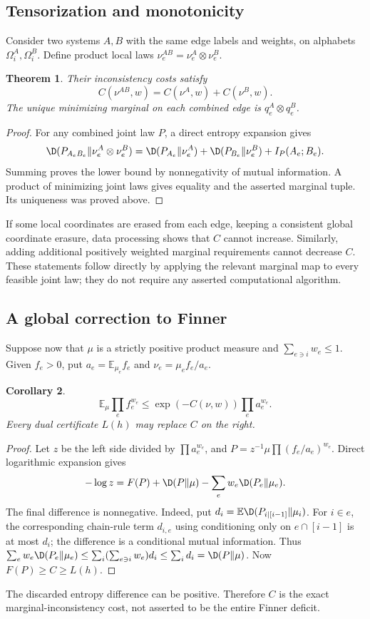 \documentclass[11pt,a4paper]{article}
\newtheorem{theorem}{Theorem}[section]
\newtheorem{corollary}[theorem]{Corollary}
\theoremstyle{definition}\newtheorem{definition}[theorem]{Definition}
\theoremstyle{remark}\newtheorem{remark}[theorem]{Remark}
\newcommand{\E}{\mathbb E}\newcommand{\one}{\mathbf 1}\newcommand{\1}{\mathbf 1}
\numberwithin{equation}{section}
\begin{document}
\subsection{Tensorization and monotonicity}\label{R02-sec-4}
Consider two systems $A,B$ with the same edge labels and weights, on alphabets $\Omega_i^A,\Omega_i^B$. Define product local laws $\nu_e^{AB}=\nu_e^A\otimes\nu_e^B$.
\begin{theorem}\label{R02-tensor}
Their inconsistency costs satisfy
\[
C(\nu^{AB},w)=C(\nu^A,w)+C(\nu^B,w).
\]
The unique minimizing marginal on each combined edge is $q_e^A\otimes q_e^B$.
\end{theorem}
\begin{proof}
For any combined joint law $P$, a direct entropy expansion gives
\[
\D(P_{A_eB_e}\Vert\nu_e^A\otimes\nu_e^B)
=\D(P_{A_e}\Vert\nu_e^A)+\D(P_{B_e}\Vert\nu_e^B)+I_P(A_e;B_e).
\]
Summing proves the lower bound by nonnegativity of mutual information. A product of minimizing joint laws gives equality and the asserted marginal tuple. Its uniqueness was proved above.
\end{proof}
If some local coordinates are erased from each edge, keeping a consistent global coordinate erasure, data processing shows that $C$ cannot increase. Similarly, adding additional positively weighted marginal requirements cannot decrease $C$. These statements follow directly by applying the relevant marginal map to every feasible joint law; they do not require any asserted computational algorithm.

\subsection{A global correction to Finner}\label{R02-sec-5}\label{R02-finner}
Suppose now that $\mu$ is a strictly positive product measure and $\sum_{e\ni i}w_e\leq1$. Given $f_e>0$, put $a_e=\E_{\mu_e}f_e$ and $\nu_e=\mu_e f_e/a_e$.
\begin{corollary}\label{R02-fincor}
\[
\E_\mu\prod_e f_e^{w_e}\leq\exp(-C(\nu,w))\prod_e a_e^{w_e}.
\]
Every dual certificate $L(h)$ may replace $C$ on the right.
\end{corollary}
\begin{proof}
Let $z$ be the left side divided by $\prod a_e^{w_e}$, and $P=z^{-1}\mu\prod(f_e/a_e)^{w_e}$. Direct logarithmic expansion gives
\[
-\log z=F(P)+\D(P\Vert\mu)-\sum_e w_e\D(P_e\Vert\mu_e).
\]
The final difference is nonnegative. Indeed, put $d_i=\E\D(P_{i\mid[i-1]}\Vert\mu_i)$. For $i\in e$, the corresponding chain-rule term $d_{i,e}$ using conditioning only on $e\cap[i-1]$ is at most $d_i$; the difference is a conditional mutual information. Thus
$\sum_e w_e\D(P_e\Vert\mu_e)\leq\sum_i(\sum_{e\ni i}w_e)d_i\leq\sum_i d_i=\D(P\Vert\mu)$.
Now $F(P)\geq C\geq L(h)$.
\end{proof}
The discarded entropy difference can be positive. Therefore $C$ is the exact marginal-inconsistency cost, not asserted to be the entire Finner deficit.
\end{document}
